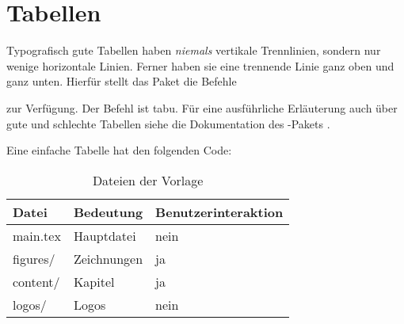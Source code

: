 \section{Tabellen}
\label{sec:Tabellen}

Typografisch gute Tabellen haben \emph{niemals} vertikale Trennlinien,
sondern nur wenige horizontale Linien.
Ferner haben sie eine trennende Linie ganz oben und ganz unten.
Hierfür stellt das Paket  die Befehle
\begin{itemize*}
  \item {}
	\item {}
	\item {}
\end{itemize*}
zur Verfügung.
Der Befehl  ist tabu.
Für eine ausführliche Erläuterung auch über gute und schlechte Tabellen
siehe die Dokumentation des -Pakets \cite{Fear2005}.

Eine einfache Tabelle hat den folgenden Code:
\begin{latex}[caption={Einfache Tabelle in \LaTeX},label={lst:tables}]
\begin{table}%
	\centering%
	\begin{tabularx}{\columnwidth}{l l X}%
		\toprule%
		Datei       &  Bedeutung    &  Benutzerinteraktion \\%
		\midrule%
		\endheader%
		main.tex  &  Hauptdatei   &  nein     \\%
		figures/  &  Zeichnungen  &  ja       \\%
		content/  &  Kapitel      &  ja       \\%
		logos/    &  Logos        &  nein     \\%
		\bottomrule%
	\end{tabularx}%
	\caption{Dateien der Vorlage}%
	\label{tab:files-dirs-of-template}%
\end{table}
\end{latex}


